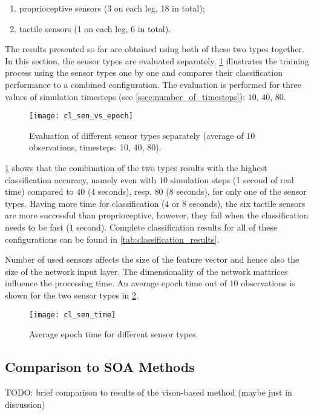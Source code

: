 \begin{enumerate}
\item proprioceptive sensors (3 on each leg, 18 in total);
\item tactile sensors (1 on each leg, 6 in total).
\end{enumerate}

The results presented so far are obtained using both of these two types together. In this section, the sensor types are evaluated separately. \cref{fig:sen_vs_epoch} illustrates the training process using the sensor types one by one and compares their classification performance to a combined configuration. The evaluation is performed for three values of simulation timesteps (see \cref{ssec:number_of_timesteps}): $ 10 $, $ 40 $, $ 80 $.

\begin{figure}[H]
  \centering
  \texttt{[image: cl\_sen\_vs\_epoch]}
  \caption{Evaluation of different sensor types separately (average of 10 observations, timesteps: 10, 40, 80).}
  \label{fig:sen_vs_epoch}
\end{figure}

\cref{fig:sen_vs_epoch} shows that the combination of the two types results with the highest classification accuracy, namely even with $ 10 $ simulation steps (1 second of real time) compared to $ 40 $ (4 seconds), resp. $ 80 $ (8 seconds), for only one of the sensor types. Having more time for classification ($ 4 $ or $ 8 $ seconds), the six tactile sensors are more successful than proprioceptive, however, they fail when the classification needs to be fast ($ 1 $ second). Complete classification results for all of these configurations can be found in \cref{tab:classification_results}.

Number of used sensors affects the size of the feature vector and hence also the size of the network input layer. The dimensionality of the network mattrices influence the processing time. An average epoch time out of 10 observations is shown for the two sensor types in \cref{fig:sen_time}. 

\begin{figure}[H]
  \centering
  \texttt{[image: cl\_sen\_time]}
  \caption{Average epoch time for different sensor types.}
  \label{fig:sen_time}
\end{figure}

\subsection{Comparison to SOA Methods} \label{ssec:terrain_classification_vs_soa}
TODO: brief comparison to results of the vison-based method (maybe just in discussion)

